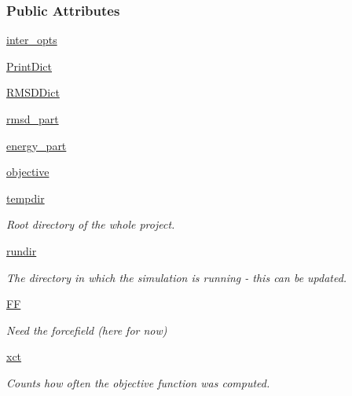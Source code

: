\subsubsection*{Public Attributes}
\begin{DoxyCompactItemize}
\item 
\hyperlink{classforcebalance_1_1binding_1_1BindingEnergy_a9d1f28fc62222da17c0fd12593042f10}{inter\-\_\-opts}
\item 
\hyperlink{classforcebalance_1_1binding_1_1BindingEnergy_ae88e256776152d847fd3c5d8609a5c6d}{Print\-Dict}
\item 
\hyperlink{classforcebalance_1_1binding_1_1BindingEnergy_a5f2f2a25d42e1b27f17fa7b289f0dd26}{R\-M\-S\-D\-Dict}
\item 
\hyperlink{classforcebalance_1_1binding_1_1BindingEnergy_a9503044f7d14bfd9f8dc98dbe7950685}{rmsd\-\_\-part}
\item 
\hyperlink{classforcebalance_1_1binding_1_1BindingEnergy_a4efa69b8f81d993b58851650d9b5ef89}{energy\-\_\-part}
\item 
\hyperlink{classforcebalance_1_1binding_1_1BindingEnergy_a58ccde0bd9924fe6799acac8e1d2eadf}{objective}
\item 
\hyperlink{classforcebalance_1_1target_1_1Target_aa1f01b5b78db253b5b66384ed11ed193}{tempdir}
\begin{DoxyCompactList}\small\item\em Root directory of the whole project. \end{DoxyCompactList}\item 
\hyperlink{classforcebalance_1_1target_1_1Target_a6872de5b2d4273b82336ea5b0da29c9e}{rundir}
\begin{DoxyCompactList}\small\item\em The directory in which the simulation is running -\/ this can be updated. \end{DoxyCompactList}\item 
\hyperlink{classforcebalance_1_1target_1_1Target_a38a37919783141ea37fdcf8b00ce0aaf}{F\-F}
\begin{DoxyCompactList}\small\item\em Need the forcefield (here for now) \end{DoxyCompactList}\item 
\hyperlink{classforcebalance_1_1target_1_1Target_aad2e385cfbf7b4a68f1c2cb41133fe82}{xct}
\begin{DoxyCompactList}\small\item\em Counts how often the objective function was computed. \end{DoxyCompactList}\item 

\end{DoxyCompactItemize}
